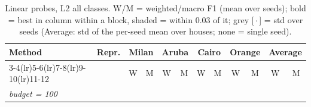 \begin{table}[H]
\centering\small
\caption{Linear probes, L2 all classes. W/M = weighted/macro F1 (mean over seeds); bold = best in column within a block, shaded = within 0.03 of it; grey [\,$\cdot$\,] = std over seeds (Average: std of the per-seed mean over houses; none = single seed).}
\label{tab:probe_l2_all}
\setlength{\tabcolsep}{3.2pt}
\begin{tabular}{llcc|cc|cc|cc|cc}
\toprule
Method & Repr. & \multicolumn{2}{c}{Milan} & \multicolumn{2}{c}{Aruba} & \multicolumn{2}{c}{Cairo} & \multicolumn{2}{c}{Orange} & \multicolumn{2}{c}{Average} \\
\cmidrule(lr){3-4}\cmidrule(lr){5-6}\cmidrule(lr){7-8}\cmidrule(lr){9-10}\cmidrule(lr){11-12}
 & & W & M & W & M & W & M & W & M & W & M \\
\midrule
\multicolumn{12}{l}{\textit{budget = 100}} \\
\midrule

\end{tabular}
\end{table}
